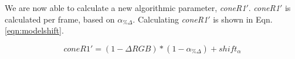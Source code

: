 We are now able to calculate a new algorithmic parameter, \textit{coneR1}$'$. \textit{coneR1}$'$ is calculated per frame, based on $\alpha_{\%\Delta}$.
Calculating \textit{coneR1}$'$ is shown in Eqn. \ref{eqn:modelshift}.

\begin{equation}
coneR1' = (1 - \Delta RGB)*(1 - \alpha_{\%\Delta}) + shift_{\alpha}
\label{eqn:modelshift}
\end{equation}